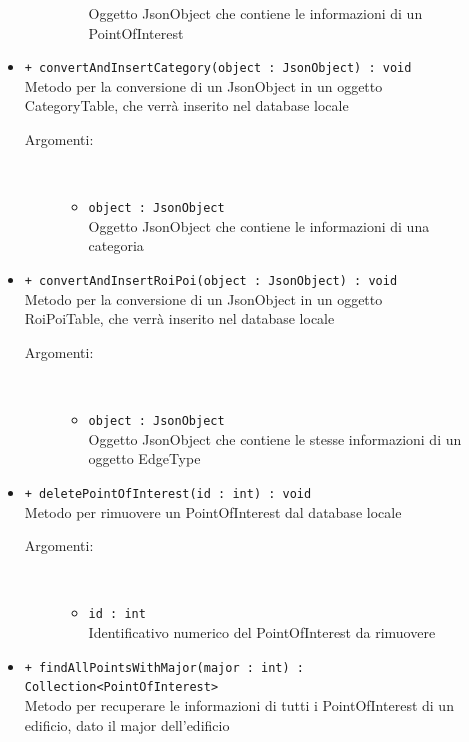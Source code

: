 \documentclass[../DefinizioneDiProdotto.tex]{subfiles}
\begin{document}
\begin{description}
\begin{itemize}
\begin{description}
\begin{itemize}
				Oggetto JsonObject che contiene le informazioni di un PointOfInterest\end{itemize}
		\end{description}
		\item \texttt{+ convertAndInsertCategory(object : JsonObject) : void}\\
		Metodo per la conversione di un JsonObject in un oggetto CategoryTable, che verrà inserito nel database locale
		\begin{description}
			\item[Argomenti:] \
			\begin{itemize}
				\item \texttt{object : JsonObject}\\
				Oggetto JsonObject che contiene le informazioni di una categoria\end{itemize}
		\end{description}
		\item \texttt{+ convertAndInsertRoiPoi(object : JsonObject) : void}\\
		Metodo per la conversione di un JsonObject in un oggetto RoiPoiTable, che verrà inserito nel database locale
		\begin{description}
			\item[Argomenti:] \
			\begin{itemize}
				\item \texttt{object : JsonObject}\\
				Oggetto JsonObject che contiene le stesse informazioni di un oggetto EdgeType\end{itemize}
		\end{description}
		\item \texttt{+ deletePointOfInterest(id : int) : void}\\
		Metodo per rimuovere un PointOfInterest dal database locale
		\begin{description}
			\item[Argomenti:] \
			\begin{itemize}
				\item \texttt{id : int}\\
				Identificativo numerico del PointOfInterest da rimuovere\end{itemize}
		\end{description}
		\item \texttt{+ findAllPointsWithMajor(major : int) :\\ Collection<PointOfInterest>}\\
		Metodo per recuperare le informazioni di tutti i PointOfInterest di un edificio, dato il major dell'edificio

\end{itemize}
\end{description}
\end{document}
